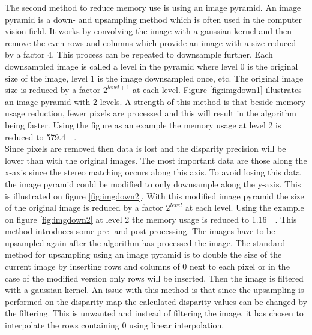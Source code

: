 The second method to reduce memory use is using an image pyramid. An image pyramid is a down- and upsampling method which is often used in the computer vision field. It works by convolving the image with a gaussian kernel and then remove the even rows and columns which provide an image with a size reduced by a factor 4. This process can be repeated to downsample further. Each downsampled image is called a level in the pyramid where level 0 is the original size of the image, level 1 is the image downsampled once, etc. The original image size is reduced by a factor $2^{level+1}$ at each level. Figure \vref{fig:imgdown1} illustrates an image pyramid with 2 levels. A strength of this method is that beside memory usage reduction, fewer pixels are processed and this will result in the algorithm being faster. Using the figure as an example the memory usage at level 2 is reduced to \SI{579.4}{\mega\byte}.\\

Since pixels are removed then data is lost and the disparity precision will be lower than with the original images. The most important data are those along the x-axis since the stereo matching occurs along this axis. To avoid losing this data the image pyramid could be modified to only downsample along the y-axis. This is illustrated on figure \vref{fig:imgdown2}. With this modified image pyramid the size of the original image is reduced by a factor $2^{level}$ at each level. Using the example on figure \vref{fig:imgdown2} at level 2 the memory usage is reduced to \SI{1.16}{\giga\byte}. 
This method introduces some pre- and post-processing. The images have to be upsampled again after the algorithm has processed the image. The standard method for upsampling using an image pyramid is to double the size of the current image by inserting rows and columns of 0 next to each pixel or in the case of the modified version only rows will be inserted. Then the image is filtered with a gaussian kernel. An issue with this method is that since the upsampling is performed on the disparity map the calculated disparity values can be changed by the filtering. This is unwanted and instead of filtering the image, it has chosen to interpolate the rows containing 0 using linear interpolation.\\

